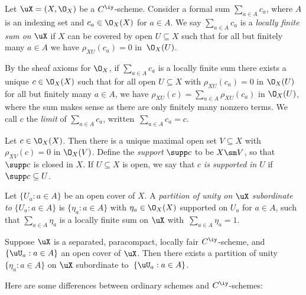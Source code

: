 \documentclass{article}
\begin{document}
\begin{dfn} Let $\uX=(X,\O_X)$ be a $C^\iy$-scheme. Consider a
formal sum $\sum_{a\in A}c_a$, where $A$ is an indexing set and
$c_a\in\O_X(X)$ for $a\in A$. We say $\sum_{a\in A}c_a$ is a {\it
locally finite sum on\/} $\uX$ if $X$ can be covered by open
$U\subseteq X$ such that for all but finitely many $a\in A$ we have
$\rho_{XU}(c_a)=0$ in~$\O_X(U)$.

By the sheaf axioms for $\O_X$, if $\sum_{a\in A}c_a$ is a locally
finite sum there exists a unique $c\in\O_X(X)$ such that for all
open $U\subseteq X$ with $\rho_{XU}(c_a)=0$ in $\O_X(U)$ for all but
finitely many $a\in A$, we have $\rho_{XU}(c)=\sum_{a\in
A}\rho_{XU}(c_a)$ in $\O_X(U)$, where the sum makes sense as there
are only finitely many nonzero terms. We call $c$ the {\it limit\/}
of $\sum_{a\in A}c_a$, written~$\sum_{a\in A}c_a=c$.

Let $c\in\O_X(X)$. Then there is a unique maximal open set
$V\subseteq X$ with $\rho_{XV}(c)=0$ in $\O_X(V)$. Define the {\it
support\/} $\supp c$ to be $X\sm V$, so that $\supp c$ is closed in
$X$. If $U\subseteq X$ is open, we say that $c$ {\it is supported
in\/} $U$ if~$\supp c\subseteq U$.

Let $\{U_a:a\in A\}$ be an open cover of $X$. A {\it partition of
unity on\/ $\uX$ subordinate to\/} $\{U_a:a\in A\}$ is
$\{\eta_a:a\in A\}$ with $\eta_a\in\O_X(X)$ supported on $U_a$ for
$a\in A$, such that $\sum_{a\in A}\eta_a$ is a locally finite sum on
$\uX$ with~$\sum_{a\in A}\eta_a=1$.
\label{ds2def4}
\end{dfn}

\begin{prop} Suppose $\uX$ is a separated, paracompact, locally fair
$C^\iy$-scheme, and\/ $\{\uU_a:a\in A\}$ an open cover of\/ $\uX$.
Then there exists a partition of unity $\{\eta_a:a\in A\}$ on $\uX$
subordinate to\/~$\{\uU_a:a\in A\}$.
\label{ds2prop1}
\end{prop}

Here are some differences between ordinary schemes and
$C^\iy$-schemes:
\end{document}
